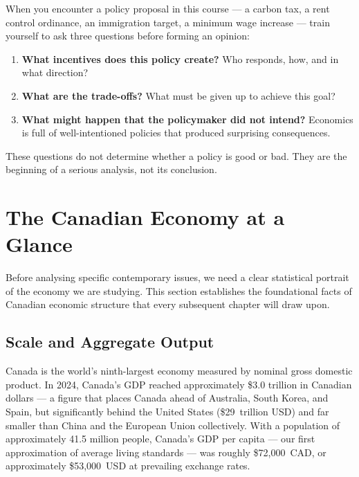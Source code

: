 \begin{thinkbox}
When you encounter a policy proposal in this course --- a carbon tax, a rent
control ordinance, an immigration target, a minimum wage increase --- train
yourself to ask three questions before forming an opinion:
\begin{enumerate}[(1)]
  \item \textbf{What incentives does this policy create?} Who responds, how,
        and in what direction?
  \item \textbf{What are the trade-offs?} What must be given up to achieve
        this goal?
  \item \textbf{What might happen that the policymaker did not intend?}
        Economics is full of well-intentioned policies that produced
        surprising consequences.
\end{enumerate}
These questions do not determine whether a policy is good or bad. They are
the beginning of a serious analysis, not its conclusion.
\end{thinkbox}

\section{The Canadian Economy at a Glance}

Before analysing specific contemporary issues, we need a clear statistical
portrait of the economy we are studying. This section establishes the
foundational facts of Canadian economic structure that every subsequent
chapter will draw upon.

\subsection{Scale and Aggregate Output}

Canada is the world's ninth-largest economy measured by nominal gross domestic
product. In 2024, Canada's GDP reached approximately \$3.0 trillion in
Canadian dollars --- a figure that places Canada ahead of Australia, South
Korea, and Spain, but significantly behind the United States (\$29~trillion
USD) and far smaller than China and the European Union collectively. With a
population of approximately 41.5 million people, Canada's GDP per capita ---
our first approximation of average living standards --- was roughly
\$72,000~CAD, or approximately \$53,000~USD at prevailing exchange rates.


